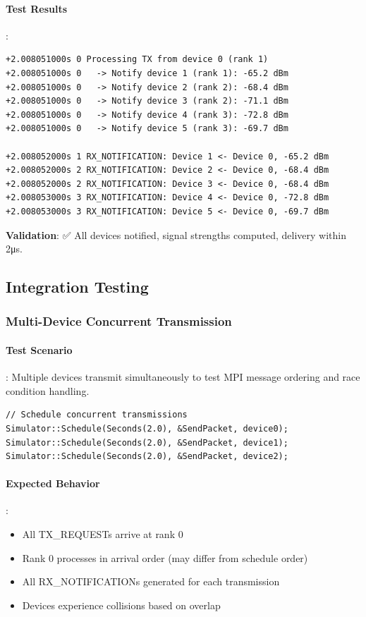 \paragraph{Test Results}:
\begin{lstlisting}[style=log]
+2.008051000s 0 Processing TX from device 0 (rank 1)
+2.008051000s 0   -> Notify device 1 (rank 1): -65.2 dBm
+2.008051000s 0   -> Notify device 2 (rank 2): -68.4 dBm
+2.008051000s 0   -> Notify device 3 (rank 2): -71.1 dBm
+2.008051000s 0   -> Notify device 4 (rank 3): -72.8 dBm
+2.008051000s 0   -> Notify device 5 (rank 3): -69.7 dBm

+2.008052000s 1 RX_NOTIFICATION: Device 1 <- Device 0, -65.2 dBm
+2.008052000s 2 RX_NOTIFICATION: Device 2 <- Device 0, -68.4 dBm
+2.008052000s 2 RX_NOTIFICATION: Device 3 <- Device 0, -68.4 dBm
+2.008053000s 3 RX_NOTIFICATION: Device 4 <- Device 0, -72.8 dBm
+2.008053000s 3 RX_NOTIFICATION: Device 5 <- Device 0, -69.7 dBm
\end{lstlisting}

\textbf{Validation}: ✅ All devices notified, signal strengths computed, delivery within 2μs.

\subsection{Integration Testing}

\subsubsection{Multi-Device Concurrent Transmission}

\paragraph{Test Scenario}:
Multiple devices transmit simultaneously to test MPI message ordering and race condition handling.

\begin{lstlisting}[style=cpp]
// Schedule concurrent transmissions
Simulator::Schedule(Seconds(2.0), &SendPacket, device0);
Simulator::Schedule(Seconds(2.0), &SendPacket, device1);
Simulator::Schedule(Seconds(2.0), &SendPacket, device2);
\end{lstlisting}

\paragraph{Expected Behavior}:
\begin{itemize}
    \item All TX\_REQUESTs arrive at rank 0
    \item Rank 0 processes in arrival order (may differ from schedule order)
    \item All RX\_NOTIFICATIONs generated for each transmission
    \item Devices experience collisions based on overlap
\end{itemize}

